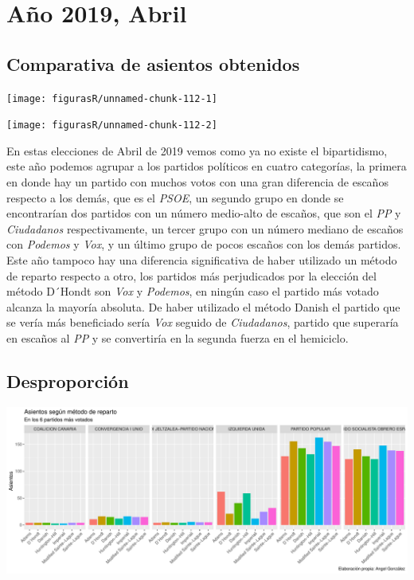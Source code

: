 \documentclass[12pt,a4paper,]{book}
\numberwithin{dummy}{section}
\theoremstyle{ocrenumbox}
\theoremstyle{blacknumex}
\theoremstyle{blacknumbox}
\theoremstyle{ocrenum}
\theoremstyle{ocrenum}
\begin{document}
\hypertarget{auxf1o-2019-abril}{%
\section{Año 2019, Abril}\label{auxf1o-2019-abril}}

\hypertarget{comparativa-de-asientos-obtenidos-13}{%
\subsection{Comparativa de asientos
obtenidos}\label{comparativa-de-asientos-obtenidos-13}}

\begin{center}\texttt{[image: figurasR/unnamed-chunk-112-1]} \end{center}

\begin{center}\texttt{[image: figurasR/unnamed-chunk-112-2]} \end{center}

En estas elecciones de Abril de 2019 vemos como ya no existe el
bipartidismo, este año podemos agrupar a los partidos políticos en
cuatro categorías, la primera en donde hay un partido con muchos votos
con una gran diferencia de escaños respecto a los demás, que es el
\emph{PSOE}, un segundo grupo en donde se encontrarían dos partidos con
un número medio-alto de escaños, que son el \emph{PP} y
\emph{Ciudadanos} respectivamente, un tercer grupo con un número mediano
de escaños con \emph{Podemos} y \emph{Vox}, y un último grupo de pocos
escaños con los demás partidos. Este año tampoco hay una diferencia
significativa de haber utilizado un método de reparto respecto a otro,
los partidos más perjudicados por la elección del método D´Hondt son
\emph{Vox} y \emph{Podemos}, en ningún caso el partido más votado
alcanza la mayoría absoluta. De haber utilizado el método Danish el
partido que se vería más beneficiado sería \emph{Vox} seguido de
\emph{Ciudadanos}, partido que superaría en escaños al \emph{PP} y se
convertiría en la segunda fuerza en el hemiciclo.

\hypertarget{desproporciuxf3n-13}{%
\subsection{Desproporción}\label{desproporciuxf3n-13}}

\begin{center}\includegraphics[width=1\linewidth]{figurasR/unnamed-chunk-113-1} \end{center}
\end{document}
